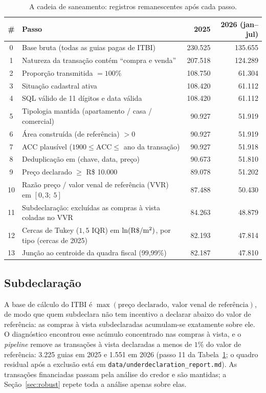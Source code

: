 \documentclass[11pt,a4paper]{article}
\newcommand{\Rsqm}{R\$/m\textsuperscript{2}}
\begin{document}
\begin{table}[t]
\centering\small
\caption{A cadeia de saneamento: registros remanescentes após cada passo.}
\label{tab:filters}
\footnotesize
\begin{tabular}{clrr}
\toprule
\# & Passo & 2025 & 2026 (jan--jul) \\
\midrule
0 & Base bruta (todas as guias pagas de ITBI) & 230.525 & 135.655 \\
1 & Natureza da transação contém ``compra e venda'' & 207.518 & 124.289 \\
2 & Proporção transmitida $= 100\%$ & 108.750 & 61.304 \\
3 & Situação cadastral ativa & 108.420 & 61.112 \\
4 & SQL válido de 11 dígitos e data válida & 108.420 & 61.112 \\
5 & Tipologia mantida (apartamento / casa / comercial) & 90.927 & 51.919 \\
6 & Área construída (de referência) $> 0$ & 90.927 & 51.919 \\
7 & ACC plausível ($1900 \le \text{ACC} \le$ ano da transação) & 90.927 & 51.918 \\
8 & Deduplicação em (chave, data, preço) & 90.673 & 51.810 \\
9 & Preço declarado $\ge$ R\$ 10.000 & 89.078 & 51.202 \\
10 & Razão preço / valor venal de referência (VVR) em $[0{,}3;\ 5]$ & 87.488 & 50.430 \\
11 & Subdeclaração: excluídas as compras à vista coladas no VVR & 84.263 & 48.879 \\
12 & Cercas de Tukey ($1{,}5$ IQR) em $\ln(\text{\Rsqm})$, por tipo (cercas de 2025) & 82.193 & 47.814 \\
13 & Junção ao centroide da quadra fiscal (99,99\%) & 82.187 & 47.810 \\
\bottomrule
\end{tabular}
\end{table}

\subsection{Subdeclaração}

A base de cálculo do ITBI é $\max(\text{preço declarado},\ \text{valor venal de referência})$,
de modo que quem subdeclara não tem incentivo a declarar abaixo do valor de referência: as
compras à vista subdeclaradas acumulam-se exatamente sobre ele. O diagnóstico encontrou esse
acúmulo concentrado nas compras à vista, e o \emph{pipeline} remove as transações à vista
declaradas a menos de $1\%$ do valor de referência: 3.225 guias em 2025 e 1.551 em 2026 (passo
11 da Tabela~\ref{tab:filters}; o quadro residual após a exclusão está em
\texttt{data/underdeclaration\_report.md}). As transações financiadas passam pela análise do
credor e são mantidas; a Seção~\ref{sec:robust} repete toda a análise apenas sobre elas.
\end{document}
